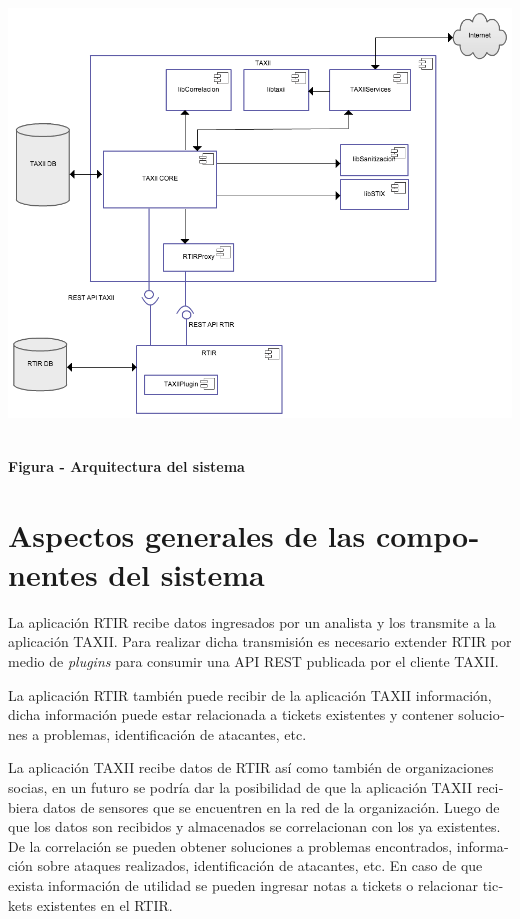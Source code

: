 \documentclass[11pt]{article}
\newcounter{Figura}
\renewcommand\theFigura{\arabic{Figura}}
\begin{document}
\bigskip

 \includegraphics[width=5.7638in,height=4.6909in]{Diseno-img003.png} 

{\centering\bfseries
\foreignlanguage{spanish}{Figura }\stepcounter{Figura}{\theFigura}\foreignlanguage{spanish}{ - Arquitectura del sistema}
\par}


\bigskip

\section[Aspectos generales de las componentes del sistema]{\foreignlanguage{spanish}{Aspectos generales de las
componentes del sistema}}
\foreignlanguage{spanish}{La aplicación RTIR recibe datos ingresados por un analista y los transmite a la aplicación
TAXII. Para realizar dicha transmisión es necesario extender RTIR por medio de
}\foreignlanguage{spanish}{\textit{plugins}}\foreignlanguage{spanish}{ para consumir una API REST publicada por el
cliente TAXII.}

\foreignlanguage{spanish}{La aplicación RTIR también puede recibir de la aplicación TAXII información, dicha información
puede estar relacionada a tickets existentes y contener soluciones a problemas, identificación de atacantes, etc.}


\bigskip

\foreignlanguage{spanish}{La aplicación TAXII recibe datos de RTIR así como también de organizaciones socias, en un
futuro se podría dar la posibilidad de que la aplicación TAXII recibiera datos de sensores que se encuentren en la red
de la organización. Luego de que los datos son recibidos y almacenados se correlacionan con los ya existentes. De la
correlación se pueden obtener soluciones a problemas encontrados, información sobre ataques realizados, identificación
de atacantes, etc. En caso de que exista información de utilidad se pueden ingresar notas a tickets o relacionar
tickets existentes en el RTIR.}
\end{document}
